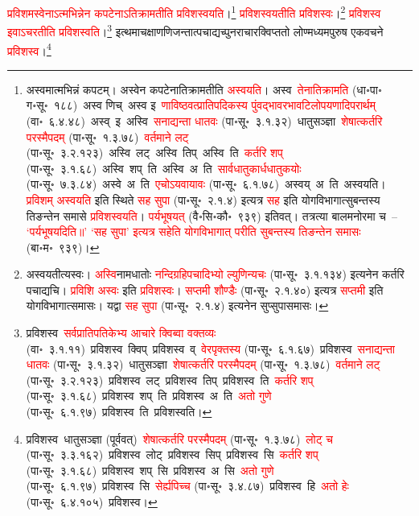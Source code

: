 \begin{sloppypar}
\textcolor{red}{प्रविशमस्वेनाऽत्मभिन्नेन कपटेनाऽतिक्रामतीति प्रविशस्वयति}।\footnote{अस्वमात्मभिन्नं कपटम्। अस्वेन कपटेनातिक्रामतीति \textcolor{red}{अस्वयति}। अस्व~\arrow \textcolor{red}{तेनातिक्रामति} (धा॰पा॰ ग॰सू॰~१८८)~\arrow अस्व णिच्~\arrow अस्व इ~\arrow \textcolor{red}{णाविष्ठवत्प्राति\-पदिकस्य पुंवद्भाव\-रभाव\-टिलोप\-यणादि\-परार्थम्} (वा॰~६.४.४८)~\arrow अस्व्~इ~\arrow अस्वि~\arrow \textcolor{red}{सनाद्यन्ता धातवः} (पा॰सू॰~३.१.३२)~\arrow धातु\-सञ्ज्ञा~\arrow \textcolor{red}{शेषात्कर्तरि परस्मैपदम्} (पा॰सू॰~१.३.७८)~\arrow \textcolor{red}{वर्तमाने लट्} (पा॰सू॰~३.२.१२३)~\arrow अस्वि~लट्~\arrow अस्वि~तिप्~\arrow अस्वि~ति~\arrow \textcolor{red}{कर्तरि शप्‌} (पा॰सू॰~३.१.६८)~\arrow अस्वि~शप्~ति~\arrow अस्वि~अ~ति~\arrow \textcolor{red}{सार्वधातुकार्धधातुकयोः} (पा॰सू॰~७.३.८४)~\arrow अस्वे~अ~ति~\arrow \textcolor{red}{एचोऽयवायावः} (पा॰सू॰~६.१.७८)~\arrow अस्वय्~अ~ति~\arrow अस्वयति। \textcolor{red}{प्रविशम् अस्वयति} इति स्थिते \textcolor{red}{सह सुपा} (पा॰सू॰~२.१.४) इत्यत्र \textcolor{red}{सह} इति योगविभागात्सुबन्तस्य तिङन्तेन समासे \textcolor{red}{प्रविशस्वयति}। \textcolor{red}{पर्यभूषयत्} (वै॰सि॰कौ॰~९३९) इतिवत्। तत्रत्या बालमनोरमा च~– \textcolor{red}{‘पर्यभूषयदिति॥’ ‘सह सुपा’ इत्यत्र सहेति योगविभागात् परीति सुबन्तस्य तिङन्तेन समासः} (बा॰म॰~९३९)।} \textcolor{red}{प्रविशस्वयतीति प्रविशस्वः}।\footnote{अस्वयतीत्यस्वः। \textcolor{red}{अस्वि}\-नामधातोः \textcolor{red}{नन्दि\-ग्रहि\-पचादिभ्यो ल्युणिन्यचः} (पा॰सू॰~३.१.१३४) इत्यनेन कर्तरि पचाद्यचि। \textcolor{red}{प्रविशि अस्वः} इति \textcolor{red}{प्रविशस्वः}। \textcolor{red}{सप्तमी शौण्डैः} (पा॰सू॰~२.१.४०) इत्यत्र \textcolor{red}{सप्तमी} इति योगविभागात्समासः। यद्वा \textcolor{red}{सह सुपा} (पा॰सू॰~२.१.४) इत्यनेन सुप्सुपासमासः।} \textcolor{red}{प्रविशस्व इवाऽचरतीति प्रविशस्वति}।\footnote{प्रविशस्व~\arrow \textcolor{red}{सर्वप्रातिपतिकेभ्य आचारे क्विब्वा वक्तव्यः} (वा॰~३.१.११)~\arrow प्रविशस्व~क्विप्~\arrow प्रविशस्व~व्~\arrow \textcolor{red}{वेरपृक्तस्य} (पा॰सू॰~६.१.६७)~\arrow प्रविशस्व~\arrow \textcolor{red}{सनाद्यन्ता धातवः} (पा॰सू॰~३.१.३२)~\arrow धातु\-सञ्ज्ञा~\arrow \textcolor{red}{शेषात्कर्तरि परस्मैपदम्} (पा॰सू॰~१.३.७८)~\arrow \textcolor{red}{वर्तमाने लट्} (पा॰सू॰~३.२.१२३)~\arrow प्रविशस्व~लट्~\arrow प्रविशस्व~तिप्~\arrow प्रविशस्व~ति~\arrow \textcolor{red}{कर्तरि शप्‌} (पा॰सू॰~३.१.६८)~\arrow प्रविशस्व~शप्~ति~\arrow प्रविशस्व~अ~ति~\arrow \textcolor{red}{अतो गुणे} (पा॰सू॰~६.१.९७)~\arrow प्रविशस्व~ति~\arrow प्रविशस्वति।} इत्थमाचक्षाण\-णिजन्तात्पचाद्यच्पुनराचारक्विप्ततो लोण्मध्यमपुरुष एकवचने \textcolor{red}{प्रविशस्व}।\footnote{प्रविशस्व~\arrow धातु\-सञ्ज्ञा (पूर्ववत्)~\arrow \textcolor{red}{शेषात्कर्तरि परस्मैपदम्} (पा॰सू॰~१.३.७८)~\arrow \textcolor{red}{लोट् च} (पा॰सू॰~३.३.१६२)~\arrow प्रविशस्व~लोट्~\arrow प्रविशस्व~सिप्~\arrow प्रविशस्व~सि~\arrow \textcolor{red}{कर्तरि शप्‌} (पा॰सू॰~३.१.६८)~\arrow प्रविशस्व~शप्~सि~\arrow प्रविशस्व~अ~सि~\arrow \textcolor{red}{अतो गुणे} (पा॰सू॰~६.१.९७)~\arrow प्रविशस्व~सि~\arrow \textcolor{red}{सेर्ह्यपिच्च} (पा॰सू॰~३.४.८७)~\arrow प्रविशस्व~हि~\arrow \textcolor{red}{अतो हेः} (पा॰सू॰~६.४.१०५)~\arrow प्रविशस्व।}\end{sloppypar}

